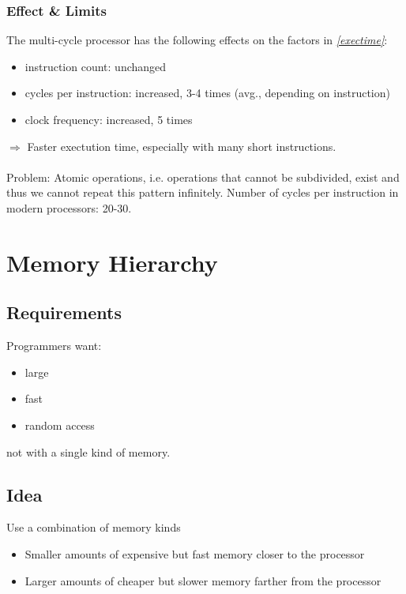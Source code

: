 \documentclass{article}
\begin{document}
\subsubsection{Effect \& Limits}
The multi-cycle processor has the following effects on the factors in \emph{\ref{exectime}}:
\begin{itemize}
	\item instruction count: unchanged
	\item cycles per instruction: increased, 3-4 times (avg., depending on instruction)
	\item clock frequency: increased, 5 times
\end{itemize}
$\Rightarrow$ Faster exectution time, especially with many short instructions.\\\\
Problem: Atomic operations, i.e. operations that cannot be subdivided, exist and thus we cannot
repeat this pattern infinitely. Number of cycles per instruction in modern processors: 20-30.



\section{Memory Hierarchy}



\subsection{Requirements}


Programmers want:
\begin{itemize}
	\item large
	\item fast 
	\item random access
\end{itemize}
\Rightarrow not with a single kind of memory.


\subsection{Idea}


Use a combination of memory kinds
\begin{itemize}
	\item Smaller amounts of expensive but fast memory closer to the processor
	\item Larger amounts of cheaper but slower memory farther from the processor
\end{itemize}
\end{document}
